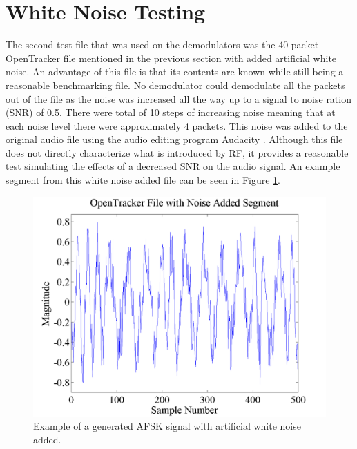 \section{White Noise Testing}
The second test file that was used on the demodulators was the 40 packet OpenTracker file mentioned in the previous section with added artificial white noise. An advantage of this file is that its contents are known while still being a reasonable benchmarking file. No demodulator could demodulate all the packets out of the file as the noise was increased all the way up to a signal to noise ration (SNR) of 0.5. There were total of 10 steps of increasing noise meaning that at each noise level there were approximately 4 packets. This noise was added to the original audio file using the audio editing program Audacity \cite{Mazzoni}. Although this file does not directly characterize what is introduced by RF, it provides a reasonable test simulating the effects of a decreased SNR on the audio signal. An example segment from this white noise added file can be seen in Figure \ref{OT3TestwNoiseSegment}.
\begin{figure}
  \centering
	\includegraphics[width=0.75\linewidth]{images/OpenTrackerFilewithNoiseAddedSegment.png} 
	\caption{Example of a generated AFSK signal with artificial white noise added.}
   \label{OT3TestwNoiseSegment}
\end{figure}
 

